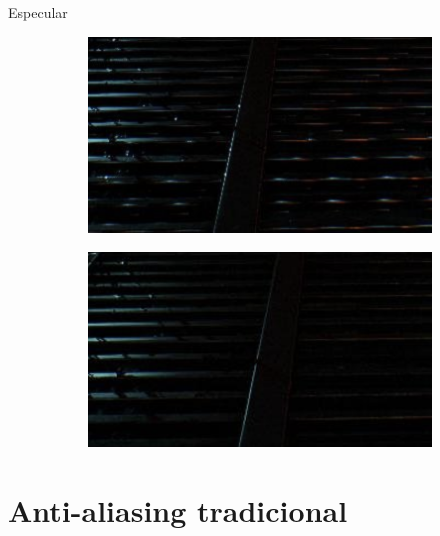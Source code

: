 \documentclass[table]{beamer}
\begin{document}
\begin{frame}[fragile]{Especular}
    \begin{figure}[!htbp]
        \centering
        \begin{subfigure}[b]{0.45\textwidth}
            \includegraphics[width=\textwidth]{figures/specular-aliasing.png}
        \end{subfigure}
        \centering
        \begin{subfigure}[b]{0.45\textwidth}
            \includegraphics[width=\textwidth]{figures/specular-fixed.png}
        \end{subfigure}
    \end{figure}
\end{frame}

\section{Anti-aliasing tradicional}
\end{document}
